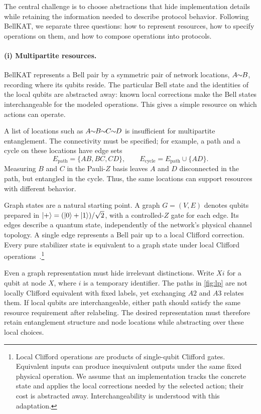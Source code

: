 
The central challenge is to choose abstractions that hide implementation details while retaining the information needed to describe protocol behavior. Following BellKAT, we separate three questions: how to represent resources, how to specify operations on them, and how to compose operations into protocols.

\paragraph{(i) Multipartite resources.}
BellKAT represents a Bell pair by a symmetric pair of network locations, $A \!\!\sim\!\! B$, recording where its qubits reside. The particular Bell state and the identities of the local qubits are abstracted away: known local corrections make the Bell states interchangeable for the modeled operations. This gives a simple resource on which actions can operate.

A list of locations such as $A\edge B\edge C\edge D$ is insufficient for multipartite entanglement. The connectivity must be specified; for example, a path and a cycle on these locations have edge sets
\[
E_{\mathrm{path}}=\{AB,BC,CD\},
\qquad
E_{\mathrm{cycle}}=E_{\mathrm{path}}\cup\{AD\}.
\]
Measuring $B$ and $C$ in the Pauli-$Z$ basis leaves $A$ and $D$ disconnected in the path, but entangled in the cycle. Thus, the same locations can support resources with different behavior.

Graph states are a natural starting point. A graph $G=(V,E)$ denotes qubits prepared in $\ket{+}=(\ket{0}+\ket{1})/\sqrt{2}$, with a controlled-$Z$ gate for each edge. Its edges describe a quantum state, independently of the network's physical channel topology. A single edge represents a Bell pair up to a local Clifford correction. Every pure stabilizer state is equivalent to a graph state under local Clifford operations~\cite{vandennest2004graphical}.\footnote{Local Clifford operations are products of single-qubit Clifford gates. Equivalent inputs can produce inequivalent outputs under the same fixed physical operation. We assume that an implementation tracks the concrete state and applies the local corrections needed by the selected action; their cost is abstracted away. Interchangeability is understood with this adaptation.}

Even a graph representation must hide irrelevant distinctions. Write $Xi$ for a qubit at node $X$, where $i$ is a temporary identifier. The paths in \cref{fig:lp} are not locally Clifford equivalent with fixed labels, yet exchanging $A2$ and $A3$ relates them. If local qubits are interchangeable, either path should satisfy the same resource requirement after relabeling. The desired representation must therefore retain entanglement structure and node locations while abstracting over these local choices.


